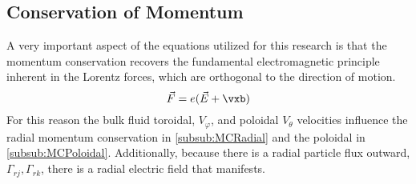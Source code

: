 \subsection{Conservation of Momentum} \label{sub:MomentumConservation}

A very important aspect of the equations utilized for this research is that the momentum conservation recovers the fundamental electromagnetic principle inherent in the Lorentz \vxb forces, which are orthogonal to the direction of motion. 
%
\begin{equation}
	\vec{F} = e(\vec{E} + \vxb)
	\label{eqn:Lorentz}
\end{equation}
%
For this reason the bulk fluid toroidal, $V_\varphi$, and poloidal $V_\theta$ velocities influence the radial momentum conservation in \cref{subsub:MCRadial} and the poloidal in \cref{subsub:MCPoloidal}. Additionally, because there is a radial particle flux outward, $\Gamma_{rj},\Gamma_{rk}$, there is a radial electric field that manifests.




